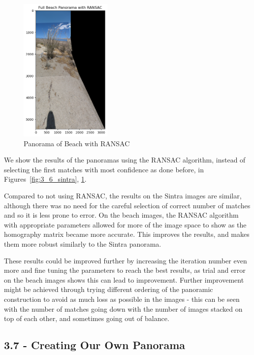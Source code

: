 \documentclass{article}
\begin{document}
\begin{figure}[h!]
    \centering
    \includegraphics[width=0.4\textwidth]{../output/3.6_beach.png}
    \caption{Panorama of Beach with RANSAC}
    \label{fig:3_6_beach}
\end{figure}

We show the results of the panoramas using the RANSAC algorithm, instead of selecting the first matches with most confidence as done before, in Figures~\ref{fig:3_6_sintra}, \ref{fig:3_6_beach}.


Compared to not using RANSAC, the results on the Sintra images are similar, although there was no need for the careful selection of correct number of matches and so it is less prone to error. On the beach images, the RANSAC algorithm with appropriate parameters allowed for more of the image space to show as the homography matrix became more accurate. This improves the results, and makes them more robust similarly to the Sintra panorama.

These results could be improved further by increasing the iteration number even more and fine tuning the parameters to reach the best results, as trial and error on the beach images shows this can lead to improvement. Further improvement might be achieved through trying different ordering of the panoramic construction to avoid as much loss as possible in the images - this can be seen with the number of matches going down with the number of images stacked on top of each other, and sometimes going out of balance.


\subsection*{3.7 - Creating Our Own Panorama}
\end{document}
